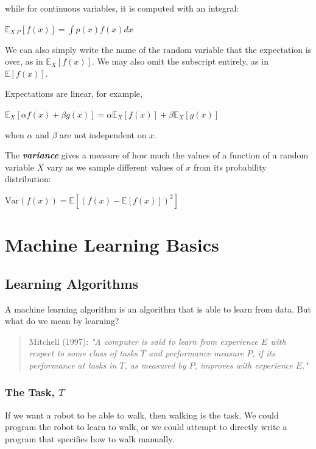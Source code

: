 \documentclass{report}
\begin{document}
\noindent while for continuous variables, it is computed with an integral:\newline\newline
\centerline{$\mathbb{E}_{X~P}[f(x)] = \int p(x)f(x)dx$}\newline

\noindent We can also simply write the name of the random variable that the expectation is over, as in $\mathbb{E}_X[f(x)]$. We may also omit the subscript entirely, as in $\mathbb{E}[f(x)]$.\newline

\noindent Expectations are linear, for example,\newline\newline
\centerline{$\mathbb{E}_X[\alpha f(x) + \beta g(x)] = \alpha \mathbb{E}_X[f(x)] + \beta \mathbb{E}_X[g(x)]$}\newline
when $\alpha$ and $\beta$ are not independent on $x$.\newline

\noindent The \textbf{\textit{variance}} gives a measure of how much the values of a function of a random variable $X$ vary as we sample different values of $x$ from its probability distribution:\newline\newline
\centerline{$\text{Var}(f(x)) = \mathbb{E}[(f(x) - \mathbb{E}[f(x)])^2]$}


\chapter{Machine Learning Basics}

\section{Learning Algorithms}
A machine learning algorithm is an algorithm that is able to learn from data. But what do we mean by learning?

\begin{quotation}
\noindent Mitchell (1997): \textit{"A computer is said to learn from experience $E$ with respect to some class of tasks $T$ and performance measure $P$, if its performance at tasks in $T$, as measured by $P$, improves with experience $E$."}
\end{quotation}

\subsection{The Task, $T$}
\noindent If we want a robot to be able to walk, then walking is the task. We could program the robot to learn to walk, or we could attempt to directly write a program that specifies how to walk manually.\newline
\end{document}

